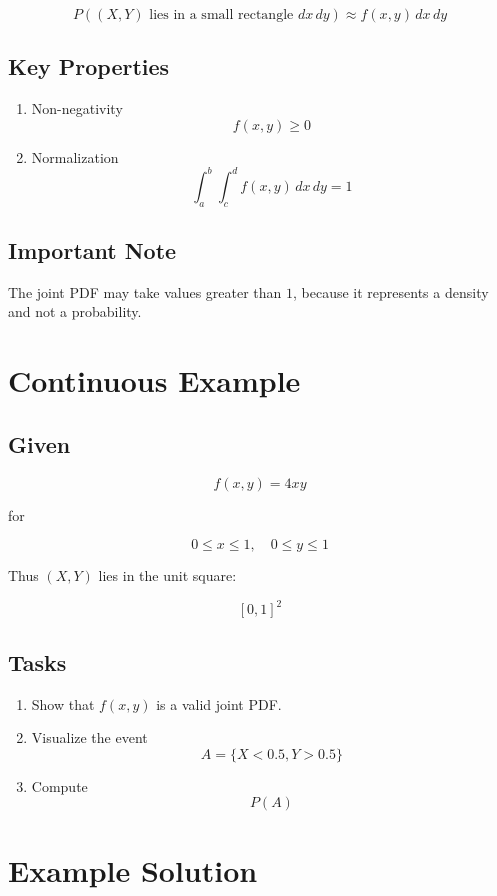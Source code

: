 \documentclass[12pt]{article}
\begin{document}
\[
P((X,Y) \text{ lies in a small rectangle } dx\,dy)
\approx f(x,y)\,dx\,dy
\]

\subsection{Key Properties}

\begin{enumerate}
\item Non-negativity
\[
f(x,y) \ge 0
\]

\item Normalization
\[
\int_a^b \int_c^d f(x,y)\,dx\,dy = 1
\]
\end{enumerate}

\subsection{Important Note}

The joint PDF may take values greater than $1$, because it represents a density and not a probability.

\section{Continuous Example}

\subsection{Given}

\[
f(x,y) = 4xy
\]

for

\[
0 \le x \le 1, \quad 0 \le y \le 1
\]

Thus $(X,Y)$ lies in the unit square:

\[
[0,1]^2
\]

\subsection{Tasks}

\begin{enumerate}
\item Show that $f(x,y)$ is a valid joint PDF.
\item Visualize the event
\[
A = \{X < 0.5, Y > 0.5\}
\]
\item Compute
\[
P(A)
\]
\end{enumerate}

\section{Example Solution}
\end{document}
